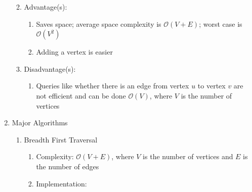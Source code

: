\documentclass [12pt, executivepaper]{article}
\begin{document}
\begin{enumerate}
\begin{enumerate}
\begin{enumerate}
\end{enumerate}

\item Advantage(s):

\begin{enumerate}

\item Saves space; average space complexity is $\mathcal{O}(V+E)$; worst case is $\mathcal{O}(V^2)$

\item Adding a vertex is easier

\end{enumerate}

\item Disadvantage(s):

\begin{enumerate}

\item Queries like whether there is an edge from vertex $u$ to vertex $v$ are not efficient and can be done $\mathcal{O}(V)$, where $V$ is the number of vertices

\end{enumerate}

\end{enumerate}

\item Major Algorithms

\begin{enumerate}

\item Breadth First Traversal

\begin{enumerate}

\item Complexity: $\mathcal{O}(V+E)$, where $V$ is the number of vertices and $E$ is the number of edges

\item Implementation:

\vspace{1mm}


\end{enumerate}
\end{enumerate}
\end{enumerate}
\end{document}
